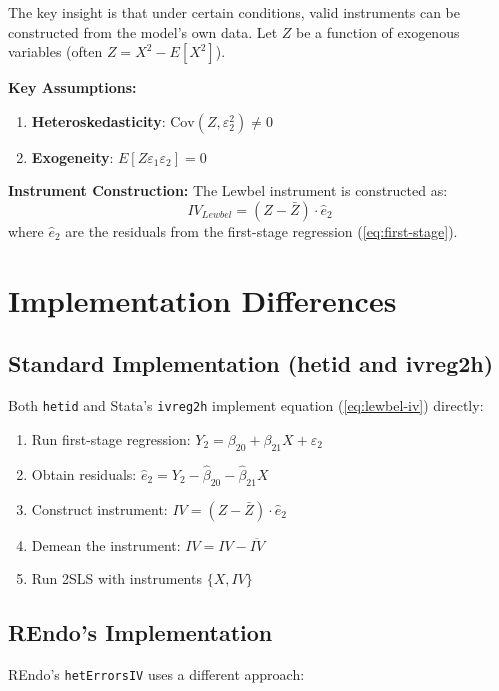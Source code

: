 \documentclass[12pt]{article}
\begin{document}
The key insight is that under certain conditions, valid instruments can be constructed from the model's own data. Let $Z$ be a function of exogenous variables (often $Z = X^2 - E[X^2]$).

\textbf{Key Assumptions:}
\begin{enumerate}
\item \textbf{Heteroskedasticity}: $\text{Cov}(Z, \varepsilon_2^2) \neq 0$
\item \textbf{Exogeneity}: $E[Z\varepsilon_1\varepsilon_2] = 0$
\end{enumerate}

\textbf{Instrument Construction:}
The Lewbel instrument is constructed as:
\begin{equation}
IV_{Lewbel} = (Z - \bar{Z}) \cdot \hat{e}_2
\label{eq:lewbel-iv}
\end{equation}
where $\hat{e}_2$ are the residuals from the first-stage regression (\ref{eq:first-stage}).

\section{Implementation Differences}

\subsection{Standard Implementation (hetid and ivreg2h)}

Both \texttt{hetid} and Stata's \texttt{ivreg2h} implement equation (\ref{eq:lewbel-iv}) directly:

\begin{enumerate}
\item Run first-stage regression: $Y_2 = \beta_{20} + \beta_{21}X + \varepsilon_2$
\item Obtain residuals: $\hat{e}_2 = Y_2 - \hat{\beta}_{20} - \hat{\beta}_{21}X$
\item Construct instrument: $IV = (Z - \bar{Z}) \cdot \hat{e}_2$
\item Demean the instrument: $IV = IV - \overline{IV}$
\item Run 2SLS with instruments $\{X, IV\}$
\end{enumerate}

\subsection{REndo's Implementation}

REndo's \texttt{hetErrorsIV} uses a different approach:
\end{document}
